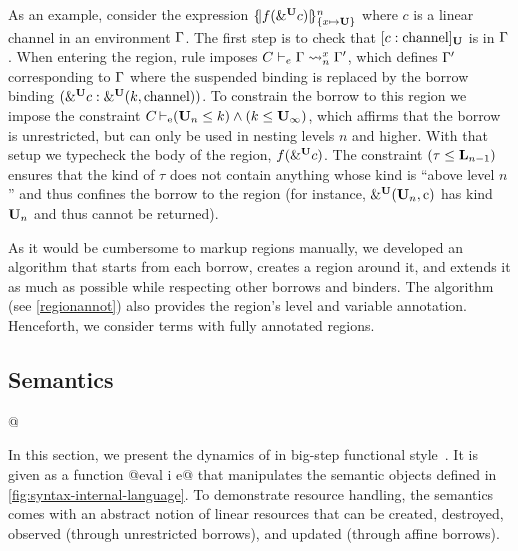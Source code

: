As an example, consider the expression $\region{\Sone x\IBORROW}{f(\borrow[\IBORROW]{c})}$
where $c$ is a linear channel in an environment $\E$.
The first step is to check that $\svar[\IBORROW]{c}{\text{channel}}$
is in $\E$.
When entering the region, rule  imposes
$\lregion{C}{x}{\E}{\E'}$, which defines $\E'$
corresponding to $\E$ where the suspended binding is replaced by the
borrow binding  $\bvar{\borrow[\IBORROW]{c}}{\borrowty[\IBORROW]{k}{\text{channel}}}$.
To constrain the borrow to this region we impose the constraint
$\entail{C}{(\kun_n\lk k) \wedge (k \lk\kun_\infty)}$, which affirms
that the borrow is unrestricted, but can only be used in nesting
levels $n$ and higher.
With that setup we typecheck the body of the region,
$f(\borrow[\IBORROW]{c})$.
The constraint $\Cleq{\tau}{\klin_{n-1}}$ ensures
that the kind of $\tau$ does not contain anything whose kind is
``above level $n$'' and thus confines the borrow to the region
(for instance, $\borrowty[\IBORROW]{\kun_n}{\text{c}}$ has kind
$\kun_n$ and thus cannot be returned).


As it would be cumbersome to markup regions manually, we developed an
algorithm that starts from each borrow, creates a region around it,
and extends it as much as possible while respecting other borrows
and binders. The algorithm (see \cref{regionannot}) also provides the region's level
and variable annotation.
Henceforth, we consider terms with fully annotated regions.







\subsection{Semantics}
\label{sec:sem}


\lstMakeShortInline[style=rule,basicstyle=\normalsize\normalfont]@

In this section, we present the dynamics of \lang in big-step
functional
style~\cite{siek13:_type_safet_three_easy_lemmas,DBLP:conf/esop/OwensMKT16,
  DBLP:conf/popl/AminR17}. It is given as a function
@eval \Store \Perm \VEnv i e@
that manipulates the semantic objects defined in
\cref{fig:syntax-internal-language}.
To demonstrate resource handling, the semantics comes with an abstract
notion of linear resources that can be created, destroyed, observed
(through unrestricted borrows), and
updated (through affine borrows).

